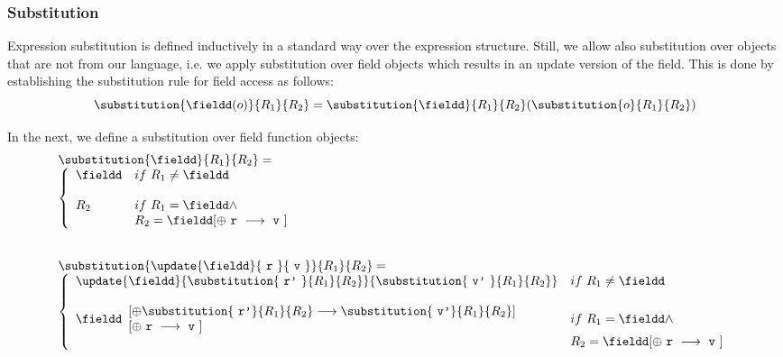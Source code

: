 \subsubsection{Substitution} \label{subst}
 Expression substitution is defined inductively in a standard way over the expression structure. Still, we allow also
 substitution over objects that are not from our language, i.e. we apply substitution over field objects which results 
 in an update version of the field. 
 This is done by establishing the substitution rule for field access as follows:
 $$  \substitution{\fieldd (o)}{R_1}{R_2} =\substitution{\fieldd}{R_1}{R_2} (  \substitution{o}{R_1}{R_2}) $$


 In the next, we define a substitution over field function objects:
$$  
\begin{array}{l}
\substitution{\fieldd}{R_1}{R_2} = \\
\left\{\begin{array}{ll}
\fieldd  & if \ R_1 \neq \fieldd\\ 
&\\ 

R_2  &  if \  R_1 = \fieldd \wedge \\
               &  R_2 = \fieldd[ \oplus \mbox{ \rm \texttt{r} } \longrightarrow \mbox{  \rm \texttt{v} } ]
\end{array}
\right. \\
\\
\\
\substitution {\update{\fieldd}{ \mbox{ \rm \texttt{r} }}{ \mbox{  \rm \texttt{v} } }} {R_1}{R_2} = \\
\left\{\begin{array}{ll}
\update{\fieldd}{ \substitution{\mbox{ \rm \texttt{r'} }}{ R_1 }{ R_2}}{ \substitution{\mbox{ \rm \texttt{v'} }}{ R_1 }{ R_2}  } 

 & if \ R_1 \neq \fieldd\\
& \\ 
\fieldd \begin{array}{l}
             \lbrack \oplus \substitution{ \mbox{ \rm \texttt{r'}}}{R_1}{R_2} \longrightarrow  \substitution{ \mbox{ \rm \texttt{v'}} }{R_1}{R_2} \rbrack \\
	     \lbrack \oplus \mbox{ \rm \texttt{r} } \longrightarrow \mbox{  \rm \texttt{v} } \rbrack
	     \end{array}
&  

                if \   R_1 = \fieldd \wedge \\
               &  R_2 = \fieldd[ \oplus \mbox{ \rm \texttt{r} } \longrightarrow \mbox{  \rm \texttt{v} } ]

\end{array}
\right. 
\end{array}
$$ 



